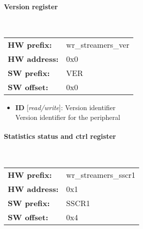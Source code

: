 \paragraph*{Version register}\mbox{}\\\vskip 6pt
\begin{tabular}{l l }
{\bf HW prefix:}  & wr\_streamers\_ver\\
{\bf HW address:}  & 0x0\\
{\bf SW prefix:}  & VER\\
{\bf SW offset:}  & 0x0\\
\end{tabular}


\vspace{12pt}
\noindent
{}

\begin{itemize}
\item \begin{small}
{\bf 
ID
} [\emph{read/write}]: Version identifier
\\
Version identifier for the peripheral
\end{small}
\end{itemize}
\paragraph*{Statistics status and ctrl register}\mbox{}\\\vskip 6pt
\begin{tabular}{l l }
{\bf HW prefix:}  & wr\_streamers\_sscr1\\
{\bf HW address:}  & 0x1\\
{\bf SW prefix:}  & SSCR1\\
{\bf SW offset:}  & 0x4\\
\end{tabular}


